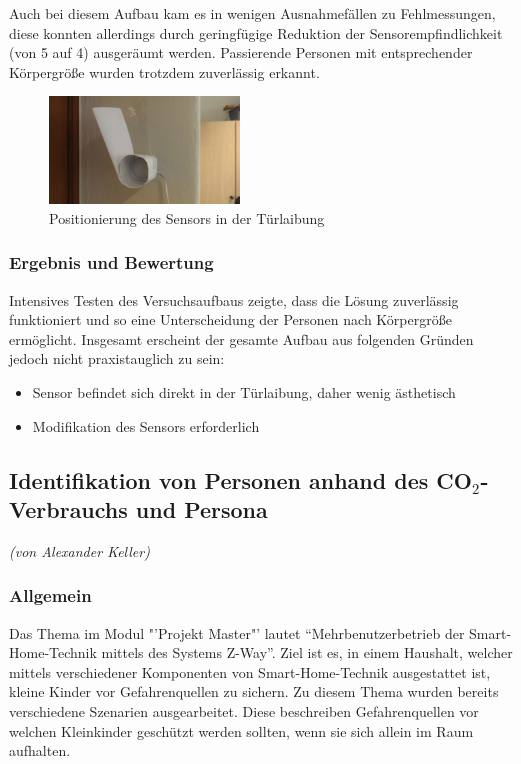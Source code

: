 Auch bei diesem Aufbau kam es in wenigen Ausnahmefällen zu Fehlmessungen, diese konnten allerdings durch geringfügige Reduktion der Sensorempfindlichkeit (von 5 auf 4) ausgeräumt werden. Passierende Personen mit entsprechender Körpergröße wurden trotzdem zuverlässig erkannt.

\begin{figure}[h!]
	\centering
	\includegraphics[width=0.45\textwidth]{img/PersonIdentification/Aeotec2.jpg}
	\caption{Positionierung des Sensors in der Türlaibung}
	\label{fig:personIdentificationAeotec2}
\end{figure}

\subsubsection{Ergebnis und Bewertung}
Intensives Testen des Versuchsaufbaus zeigte, dass die Lösung zuverlässig funktioniert und so eine Unterscheidung der Personen nach Körpergröße ermöglicht. Insgesamt erscheint der gesamte Aufbau aus folgenden Gründen jedoch nicht praxistauglich zu sein:
\begin{itemize}
	\item Sensor befindet sich direkt in der Türlaibung, daher wenig ästhetisch
	\item Modifikation des Sensors erforderlich
\end{itemize}

\subsection{Identifikation von Personen anhand des CO$_2$-Verbrauchs und Persona}
\emph{(von Alexander Keller)}

\subsubsection{Allgemein}
Das Thema im Modul "'Projekt Master"' lautet "`Mehrbenutzerbetrieb der Smart-Home-Technik mittels des Systems Z-Way"'. Ziel ist es, in einem Haushalt, welcher mittels verschiedener Komponenten von Smart-Home-Technik ausgestattet ist, kleine Kinder vor Gefahrenquellen zu sichern. Zu diesem Thema wurden bereits verschiedene Szenarien ausgearbeitet. Diese beschreiben Gefahrenquellen vor welchen Kleinkinder geschützt werden sollten, wenn sie sich allein im Raum aufhalten.


